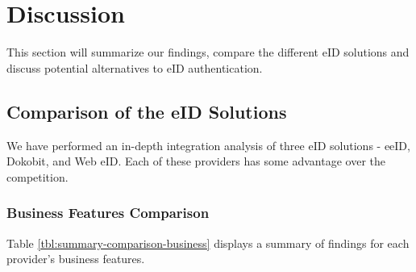 \section{Discussion}

This section will summarize our findings, compare the different eID solutions and discuss potential alternatives to eID authentication.

\subsection{Comparison of the eID Solutions}

We have performed an in-depth integration analysis of three eID solutions - eeID, Dokobit, and Web eID. Each of these providers has some advantage over the competition.

\subsubsection{Business Features Comparison}

Table \ref{tbl:summary-comparison-business} displays a summary of findings for each provider's business features.

